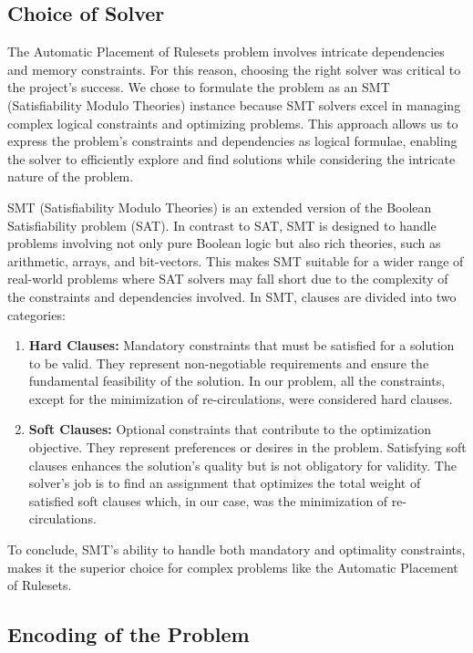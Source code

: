 \subsection{Choice of Solver}

The Automatic Placement of Rulesets problem involves intricate dependencies and memory constraints. For this reason, choosing the right solver was critical to the project's success. We chose to formulate the problem as an SMT (Satisfiability Modulo Theories) instance because SMT solvers excel in managing complex logical constraints and optimizing problems. This approach allows us to express the problem's constraints and dependencies as logical formulae, enabling the solver to efficiently explore and find solutions while considering the intricate nature of the problem.

SMT (Satisfiability Modulo Theories) is an extended version of the Boolean Satisfiability problem (SAT). In contrast to SAT, SMT is designed to handle problems involving not only pure Boolean logic but also rich theories, such as arithmetic, arrays, and bit-vectors. This makes SMT suitable for a wider range of real-world problems where SAT solvers may fall short due to the complexity of the constraints and dependencies involved. In SMT, clauses are divided into two categories:

\begin{enumerate}
    \item \textbf{Hard Clauses:} Mandatory constraints that must be satisfied for a solution to be valid. They represent non-negotiable requirements and ensure the fundamental feasibility of the solution. In our problem, all the constraints, except for the minimization of re-circulations, were considered hard clauses.

    \item \textbf{Soft Clauses:} Optional constraints that contribute to the optimization objective. They represent preferences or desires in the problem. Satisfying soft clauses enhances the solution's quality but is not obligatory for validity. The solver's job is to find an assignment that optimizes the total weight of satisfied soft clauses which, in our case, was the minimization of re-circulations.
\end{enumerate}

To conclude, SMT's ability to handle both mandatory and optimality constraints, makes it the superior choice for complex problems like the Automatic Placement of Rulesets.

\subsection{Encoding of the Problem}

